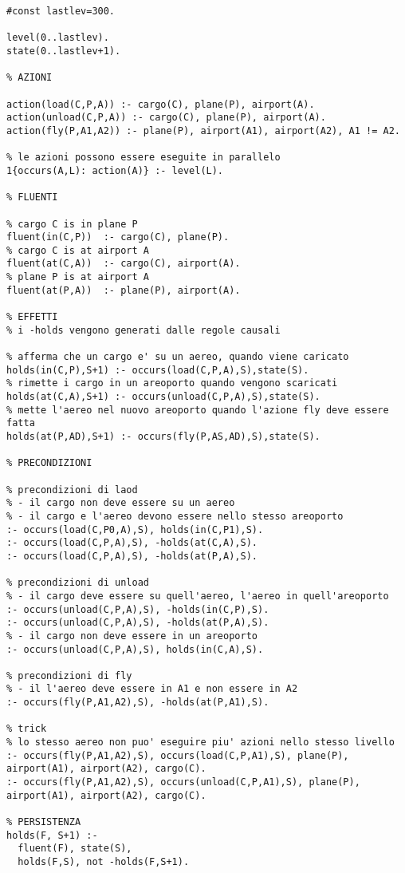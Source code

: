 \begin{lstlisting}
#const lastlev=300.

level(0..lastlev).
state(0..lastlev+1).

% AZIONI

action(load(C,P,A)) :- cargo(C), plane(P), airport(A).
action(unload(C,P,A)) :- cargo(C), plane(P), airport(A).
action(fly(P,A1,A2)) :- plane(P), airport(A1), airport(A2), A1 != A2.

% le azioni possono essere eseguite in parallelo
1{occurs(A,L): action(A)} :- level(L).

% FLUENTI

% cargo C is in plane P
fluent(in(C,P))  :- cargo(C), plane(P).
% cargo C is at airport A
fluent(at(C,A))  :- cargo(C), airport(A).
% plane P is at airport A
fluent(at(P,A))  :- plane(P), airport(A).

% EFFETTI
% i -holds vengono generati dalle regole causali

% afferma che un cargo e' su un aereo, quando viene caricato
holds(in(C,P),S+1) :- occurs(load(C,P,A),S),state(S).
% rimette i cargo in un areoporto quando vengono scaricati
holds(at(C,A),S+1) :- occurs(unload(C,P,A),S),state(S).
% mette l'aereo nel nuovo areoporto quando l'azione fly deve essere fatta
holds(at(P,AD),S+1) :- occurs(fly(P,AS,AD),S),state(S).

% PRECONDIZIONI

% precondizioni di laod
% - il cargo non deve essere su un aereo
% - il cargo e l'aereo devono essere nello stesso areoporto
:- occurs(load(C,P0,A),S), holds(in(C,P1),S).
:- occurs(load(C,P,A),S), -holds(at(C,A),S).
:- occurs(load(C,P,A),S), -holds(at(P,A),S).

% precondizioni di unload
% - il cargo deve essere su quell'aereo, l'aereo in quell'areoporto
:- occurs(unload(C,P,A),S), -holds(in(C,P),S).
:- occurs(unload(C,P,A),S), -holds(at(P,A),S).
% - il cargo non deve essere in un areoporto
:- occurs(unload(C,P,A),S), holds(in(C,A),S).

% precondizioni di fly
% - il l'aereo deve essere in A1 e non essere in A2
:- occurs(fly(P,A1,A2),S), -holds(at(P,A1),S).

% trick
% lo stesso aereo non puo' eseguire piu' azioni nello stesso livello
:- occurs(fly(P,A1,A2),S), occurs(load(C,P,A1),S), plane(P), airport(A1), airport(A2), cargo(C).
:- occurs(fly(P,A1,A2),S), occurs(unload(C,P,A1),S), plane(P), airport(A1), airport(A2), cargo(C).

% PERSISTENZA
holds(F, S+1) :-
  fluent(F), state(S),
  holds(F,S), not -holds(F,S+1).


\end{lstlisting}
